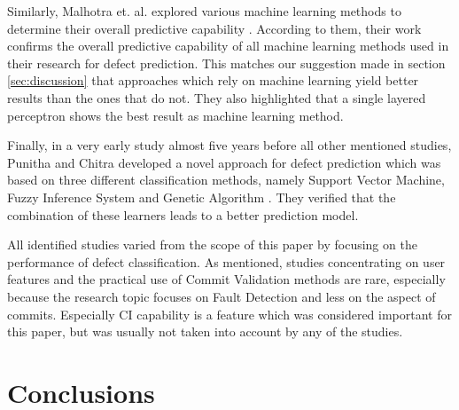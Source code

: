 Similarly, Malhotra et. al. explored various machine learning methods to determine their overall predictive capability \cite{Malhotra2017}. According to them, their work confirms the overall predictive capability of all machine learning methods used in their research for defect prediction. This matches our suggestion made in section \ref{sec:discussion} that approaches which rely on machine learning yield better results than the ones that do not. They also highlighted that a single layered perceptron shows the best result as machine learning method.

Finally, in a very early study almost five years before all other mentioned studies, Punitha and Chitra developed a novel approach for defect prediction which was based on three different classification methods, namely Support Vector Machine, Fuzzy Inference System and Genetic Algorithm \cite{Punitha2013}. They verified that the combination of these learners leads to a better prediction model.

All identified studies varied from the scope of this paper by focusing on the performance of defect classification. As mentioned, studies concentrating on user features and the practical use of Commit Validation methods are rare, especially because the research topic focuses on Fault Detection and less on the aspect of commits. Especially CI capability is a feature which was considered important for this paper, but was usually not taken into account by any of the studies.


\section{Conclusions}
\label{sec:conclusions}


